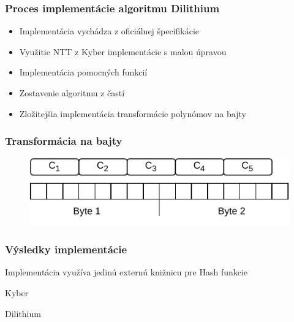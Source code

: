 \documentclass[%
  14pt,       				%
	t,                  %
	aspectratio=1610,   %
	unicode,						%
]{beamer}				    	%
\begin{document}
\begin{frame}[c]
	\frametitle{Proces implementácie algoritmu Dilithium}
	\large{
		\begin{itemize}
			\item Implementácia vychádza z oficiálnej špecifikácie
			\item Využitie NTT z Kyber implementácie s malou úpravou
			\item Implementácia pomocných funkcií
			\item Zostavenie algoritmu z častí
			\item Zložitejšia implementácia transformácie polynómov na bajty
		\end{itemize}
	}
\end{frame}

\begin{frame}[c]
	\frametitle{Transformácia na bajty}
	\begin{figure}[htbp]
		\centering
		\includegraphics[width=\textwidth]{pictures/bit_packing.pdf}
	\end{figure}
\end{frame}


\begin{frame}[c]
	\frametitle{Výsledky implementácie}
	Implementácia využíva jedinú externú knižnicu pre Hash funkcie
	\begin{table}[htbp]
		\centering
		
		\caption{Kyber}
	\end{table}
	\begin{table}[htbp]
		\centering
		
		\caption{Dilithium}
	\end{table}
\end{frame}

\end{document}
